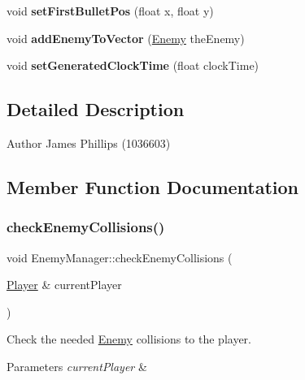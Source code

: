 \begin{DoxyCompactItemize}
\item 
\mbox{\label{class_enemy_manager_a217800f39e93529dc7c912857f5a4228}} 
void {\bfseries set\+First\+Bullet\+Pos} (float x, float y)
\item 
\mbox{\label{class_enemy_manager_a73b9e07b84f4c25f88d09744aa373f3b}} 
void {\bfseries add\+Enemy\+To\+Vector} (\hyperlink{class_enemy}{Enemy} the\+Enemy)
\item 
\mbox{\label{class_enemy_manager_a6258b25ccc4866129f9bfe176ee22c1f}} 
void {\bfseries set\+Generated\+Clock\+Time} (float clock\+Time)
\end{DoxyCompactItemize}


\subsection{Detailed Description}
\begin{DoxyAuthor}{Author}
James Phillips (1036603) 
\end{DoxyAuthor}


\subsection{Member Function Documentation}
\mbox{\label{class_enemy_manager_a317b11ce52e67c7b760b2b81755fd95f}} 
\subsubsection{\texorpdfstring{check\+Enemy\+Collisions()}{checkEnemyCollisions()}}
{\footnotesize\ttfamily void Enemy\+Manager\+::check\+Enemy\+Collisions (\begin{DoxyParamCaption}\item[{\hyperlink{class_player}{Player} \&}]{current\+Player }\end{DoxyParamCaption})}



Check the needed \hyperlink{class_enemy}{Enemy} collisions to the player. 


\begin{DoxyParams}{Parameters}
{\em current\+Player} & \\
\hline
\end{DoxyParams}
\mbox{\label{class_enemy_manager_af740dd63780a06fde9a5dd72330624da}} 
